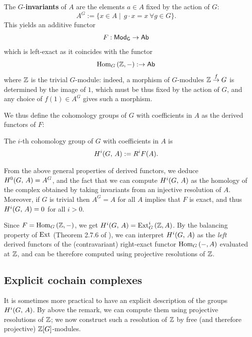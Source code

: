 \documentclass[a4paper, oneside]{memoir}
\begin{document}
\begin{definition}
    The $G$-\textbf{invariants} of $A$ are the elements $a \in A$ fixed by the action of $G$:
    \[
        A^G:=\{x\in A\mid\, g\cdot x=x ~ \forall g\in G\}.
    \]
    This yields an additive functor
    \[
        F:\mathsf{Mod}_\mathsf{G}\to\mathsf{Ab}
    \]
    which is left-exact as it coincides with the functor
    \[
        \operatorname{Hom}_G{(\mathbb{Z},-)}:\to\mathsf{Ab}
    \]
    where $\mathbb{Z}$ is the trivial $G$-module: indeed, a morphism of $G$-modules $\mathbb{Z}\overset{f}\to G$ is determined by the image of $1$, which must be thus fixed by the action of $G$, and any choice of $f(1)\in A^G$ gives such a morphism.
\end{definition}

We thus define the cohomology groups of $G$ with coefficients in $A$ as the derived functors of $F$:

\begin{definition}
    The $i$-th cohomology group of $G$ with coefficients in $A$ is
    \[
        H^{i}( G, \, A ):=R^iF(A).
    \]
\end{definition}
From the above general properties of derived functors, we deduce $H^{0}( G, \, A )=A^G$, and the fact that we can compute $H^{i}( G, \, A )$ as the homology of the complex obtained by taking  invariants from an injective resolution of $A$. Moreover, if $G$ is trivial then $A^G=A$ for all $A$ implies that $F$ is exact, and thus $H^{i}( G, \, A )=0$ for all $i>0$.

\begin{remark}
    Since $F=\operatorname{Hom}_G{(\mathbb{Z},-)}$, we get $H^{i}( G, \, A )=\operatorname{Ext}^i_G{(\mathbb{Z},A)}$. By the balancing property of $\operatorname{Ext}$ (Theorem 2.7.6 of \cite{Weibel}), we can interpret $H^{i}( G, \, A )$ as the \textit{left} derived functors of the (contravariant) right-exact functor $\operatorname{Hom}_G{(-,A)}$ evaluated at $\mathbb{Z}$, and can be therefore computed using projective resolutions of $\mathbb{Z}$.
\end{remark}

\subsection{Explicit cochain complexes}

It is sometimes more practical to have an explicit description of the groups $H^{i}( G, \, A )$. By above the remark, we can compute them using projective resolutions of $\mathbb{Z}$; we now construct such a resolution of $\mathbb{Z}$ by free (and therefore projective) $\mathbb{Z}[G]$-modules.
\end{document}
